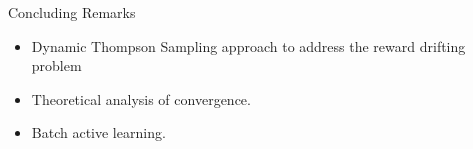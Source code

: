 \documentclass{beamer}
\begin{document}
\begin{frame}{Concluding Remarks}
	\begin{itemize}
		\item Dynamic Thompson Sampling approach to address	the reward drifting problem
		\item Theoretical analysis of convergence.
		\item Batch active learning.
	\end{itemize}
\end{frame}
\end{document}

